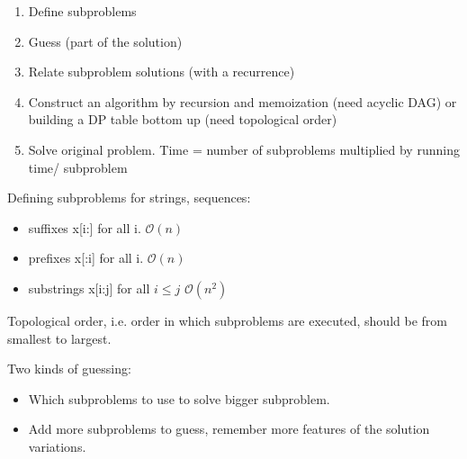 \documentclass{article}
\begin{document}
    
    \begin{enumerate}
        \item Define subproblems
        \item Guess (part of the solution)
        \item Relate subproblem solutions (with a recurrence)
        \item Construct an algorithm by recursion and memoization (need acyclic DAG) or building a DP table bottom up (need topological order)
        \item Solve original problem. Time = number of subproblems multiplied by running time/ subproblem
    \end{enumerate}
    
    Defining subproblems for strings, sequences:
    \begin{itemize}
        \item suffixes x[i:] for all i. $\mathcal{O}(n)$
        \item prefixes x[:i] for all i. $\mathcal{O}(n)$
        \item substrings x[i:j] for all $i \leq j$ $\mathcal{O}(n^2)$
    \end{itemize}
    
    Topological order, i.e. order in which subproblems are executed, should be from smallest to largest.
    
    Two kinds of guessing:
    \begin{itemize}
        \item Which subproblems to use to solve bigger subproblem.
        \item Add more subproblems to guess, remember more features of the solution variations.
    \end{itemize}
    
    
\end{document}
